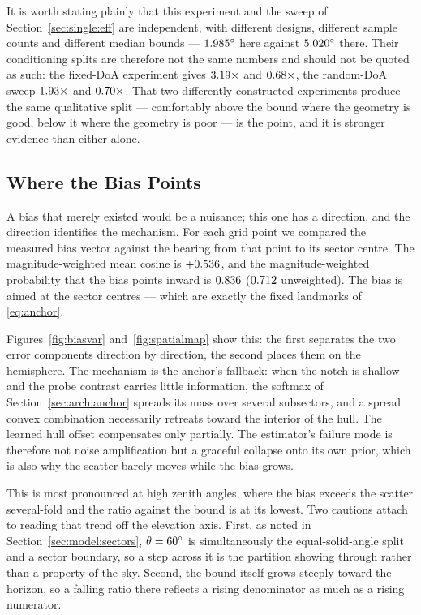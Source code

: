 \documentclass[journal]{IEEEtran}
\newcommand{\degs}{^\circ}
\begin{document}
It is worth stating plainly that this experiment and the sweep of
Section~\ref{sec:single:eff} are independent, with different designs,
different sample counts and different median bounds --- $\fdSplit\degs$ here
against $\crbPhaseOneMed\degs$ there. Their conditioning splits are therefore
not the same numbers and should not be quoted as such: the fixed-DoA
experiment gives $3.19\times$ and $0.68\times$, the random-DoA
sweep $1.93\times$ and $0.70\times$. That two differently constructed
experiments produce the same qualitative split --- comfortably above the bound
where the geometry is good, below it where the geometry is poor --- is the
point, and it is stronger evidence than either alone.

\subsection{Where the Bias Points}
\label{sec:single:where}

A bias that merely existed would be a nuisance; this one has a direction, and
the direction identifies the mechanism. For each grid point we compared the
measured bias vector against the bearing from that point to its sector centre.
The magnitude-weighted mean cosine is $+0.536$, and the
magnitude-weighted probability that the bias points inward is $0.836$
($0.712$ unweighted). The bias is aimed at the sector centres --- which
are exactly the fixed landmarks of \eqref{eq:anchor}.

Figures~\ref{fig:biasvar} and~\ref{fig:spatialmap} show this: the first
separates the two error components direction by direction, the second places
them on the hemisphere. The mechanism is the anchor's
fallback: when the notch is shallow and the probe contrast carries little
information, the softmax of Section~\ref{sec:arch:anchor} spreads its mass
over several subsectors, and a spread convex combination necessarily retreats
toward the interior of the hull. The learned hull offset compensates only
partially. The estimator's failure mode is therefore not noise amplification
but a graceful collapse onto its own prior, which is also why the scatter
barely moves while the bias grows.

This is most pronounced at high zenith angles, where the bias exceeds the
scatter several-fold and the ratio against the bound is at its lowest. Two
cautions attach to reading that trend off the elevation axis. First, as noted
in Section~\ref{sec:model:sectors}, $\theta = \elevSplit\degs$ is
simultaneously the equal-solid-angle split and a sector boundary, so a step
across it is the partition showing through rather than a property of the sky.
Second, the bound itself grows steeply toward the horizon, so a falling ratio
there reflects a rising denominator as much as a rising numerator.
\end{document}
